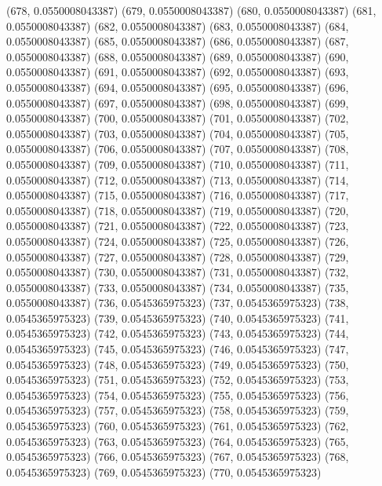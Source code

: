 {					(678, 0.0550008043387)
					(679, 0.0550008043387)
					(680, 0.0550008043387)
					(681, 0.0550008043387)
					(682, 0.0550008043387)
					(683, 0.0550008043387)
					(684, 0.0550008043387)
					(685, 0.0550008043387)
					(686, 0.0550008043387)
					(687, 0.0550008043387)
					(688, 0.0550008043387)
					(689, 0.0550008043387)
					(690, 0.0550008043387)
					(691, 0.0550008043387)
					(692, 0.0550008043387)
					(693, 0.0550008043387)
					(694, 0.0550008043387)
					(695, 0.0550008043387)
					(696, 0.0550008043387)
					(697, 0.0550008043387)
					(698, 0.0550008043387)
					(699, 0.0550008043387)
					(700, 0.0550008043387)
					(701, 0.0550008043387)
					(702, 0.0550008043387)
					(703, 0.0550008043387)
					(704, 0.0550008043387)
					(705, 0.0550008043387)
					(706, 0.0550008043387)
					(707, 0.0550008043387)
					(708, 0.0550008043387)
					(709, 0.0550008043387)
					(710, 0.0550008043387)
					(711, 0.0550008043387)
					(712, 0.0550008043387)
					(713, 0.0550008043387)
					(714, 0.0550008043387)
					(715, 0.0550008043387)
					(716, 0.0550008043387)
					(717, 0.0550008043387)
					(718, 0.0550008043387)
					(719, 0.0550008043387)
					(720, 0.0550008043387)
					(721, 0.0550008043387)
					(722, 0.0550008043387)
					(723, 0.0550008043387)
					(724, 0.0550008043387)
					(725, 0.0550008043387)
					(726, 0.0550008043387)
					(727, 0.0550008043387)
					(728, 0.0550008043387)
					(729, 0.0550008043387)
					(730, 0.0550008043387)
					(731, 0.0550008043387)
					(732, 0.0550008043387)
					(733, 0.0550008043387)
					(734, 0.0550008043387)
					(735, 0.0550008043387)
					(736, 0.0545365975323)
					(737, 0.0545365975323)
					(738, 0.0545365975323)
					(739, 0.0545365975323)
					(740, 0.0545365975323)
					(741, 0.0545365975323)
					(742, 0.0545365975323)
					(743, 0.0545365975323)
					(744, 0.0545365975323)
					(745, 0.0545365975323)
					(746, 0.0545365975323)
					(747, 0.0545365975323)
					(748, 0.0545365975323)
					(749, 0.0545365975323)
					(750, 0.0545365975323)
					(751, 0.0545365975323)
					(752, 0.0545365975323)
					(753, 0.0545365975323)
					(754, 0.0545365975323)
					(755, 0.0545365975323)
					(756, 0.0545365975323)
					(757, 0.0545365975323)
					(758, 0.0545365975323)
					(759, 0.0545365975323)
					(760, 0.0545365975323)
					(761, 0.0545365975323)
					(762, 0.0545365975323)
					(763, 0.0545365975323)
					(764, 0.0545365975323)
					(765, 0.0545365975323)
					(766, 0.0545365975323)
					(767, 0.0545365975323)
					(768, 0.0545365975323)
					(769, 0.0545365975323)
					(770, 0.0545365975323)
}
